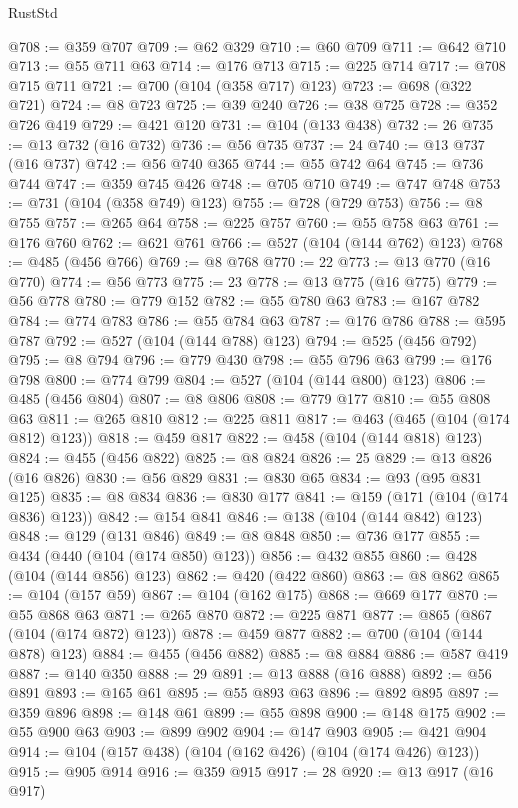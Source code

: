 \begin{lexlean}{RustStd}
\begin{coremodule}
@708 := @359 @707
@709 := @62 @329
@710 := @60 @709
@711 := @642 @710
@713 := @55 @711 @63
@714 := @176 @713
@715 := @225 @714
@717 := @708 @715 @711
@721 := @700 (@104 (@358 @717) @123)
@723 := @698 (@322 @721)
@724 := @8 @723
@725 := @39 @240
@726 := @38 @725
@728 := @352 @726 @419
@729 := @421 @120
@731 := @104 (@133 @438)
@732 := 26
@735 := @13 @732 (@16 @732)
@736 := @56 @735
@737 := 24
@740 := @13 @737 (@16 @737)
@742 := @56 @740 @365
@744 := @55 @742 @64
@745 := @736 @744
@747 := @359 @745 @426
@748 := @705 @710
@749 := @747 @748
@753 := @731 (@104 (@358 @749) @123)
@755 := @728 (@729 @753)
@756 := @8 @755
@757 := @265 @64
@758 := @225 @757
@760 := @55 @758 @63
@761 := @176 @760
@762 := @621 @761
@766 := @527 (@104 (@144 @762) @123)
@768 := @485 (@456 @766)
@769 := @8 @768
@770 := 22
@773 := @13 @770 (@16 @770)
@774 := @56 @773
@775 := 23
@778 := @13 @775 (@16 @775)
@779 := @56 @778
@780 := @779 @152
@782 := @55 @780 @63
@783 := @167 @782
@784 := @774 @783
@786 := @55 @784 @63
@787 := @176 @786
@788 := @595 @787
@792 := @527 (@104 (@144 @788) @123)
@794 := @525 (@456 @792)
@795 := @8 @794
@796 := @779 @430
@798 := @55 @796 @63
@799 := @176 @798
@800 := @774 @799
@804 := @527 (@104 (@144 @800) @123)
@806 := @485 (@456 @804)
@807 := @8 @806
@808 := @779 @177
@810 := @55 @808 @63
@811 := @265 @810
@812 := @225 @811
@817 := @463 (@465 (@104 (@174 @812) @123))
@818 := @459 @817
@822 := @458 (@104 (@144 @818) @123)
@824 := @455 (@456 @822)
@825 := @8 @824
@826 := 25
@829 := @13 @826 (@16 @826)
@830 := @56 @829
@831 := @830 @65
@834 := @93 (@95 @831 @125)
@835 := @8 @834
@836 := @830 @177
@841 := @159 (@171 (@104 (@174 @836) @123))
@842 := @154 @841
@846 := @138 (@104 (@144 @842) @123)
@848 := @129 (@131 @846)
@849 := @8 @848
@850 := @736 @177
@855 := @434 (@440 (@104 (@174 @850) @123))
@856 := @432 @855
@860 := @428 (@104 (@144 @856) @123)
@862 := @420 (@422 @860)
@863 := @8 @862
@865 := @104 (@157 @59)
@867 := @104 (@162 @175)
@868 := @669 @177
@870 := @55 @868 @63
@871 := @265 @870
@872 := @225 @871
@877 := @865 (@867 (@104 (@174 @872) @123))
@878 := @459 @877
@882 := @700 (@104 (@144 @878) @123)
@884 := @455 (@456 @882)
@885 := @8 @884
@886 := @587 @419
@887 := @140 @350
@888 := 29
@891 := @13 @888 (@16 @888)
@892 := @56 @891
@893 := @165 @61
@895 := @55 @893 @63
@896 := @892 @895
@897 := @359 @896
@898 := @148 @61
@899 := @55 @898
@900 := @148 @175
@902 := @55 @900 @63
@903 := @899 @902
@904 := @147 @903
@905 := @421 @904
@914 := @104 (@157 @438) (@104 (@162 @426) (@104 (@174 @426) @123))
@915 := @905 @914
@916 := @359 @915
@917 := 28
@920 := @13 @917 (@16 @917)

\end{coremodule}
\end{lexlean}
